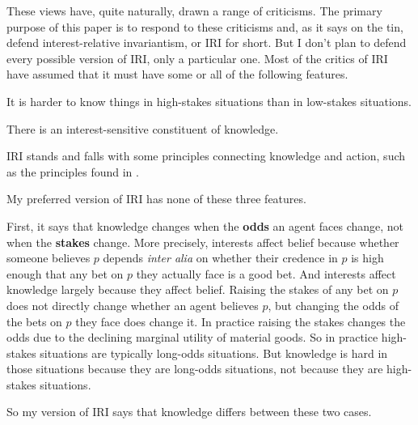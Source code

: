 \documentclass[oneside]{book}
\begin{document}
These views have, quite naturally, drawn a range of criticisms. The primary purpose of this paper is to respond to these criticisms and, as it says on the tin, defend interest-relative invariantism, or IRI for short. But I don't plan to defend every possible version of IRI, only a particular one. Most of the critics of IRI have assumed that it must have some or all of the following features.

\begin{enumerate*}
\item It is harder to know things in high-stakes situations than in low-stakes situations.
\item There is an interest-sensitive constituent of knowledge.
\item IRI stands and falls with some principles connecting knowledge and action, such as the principles found in \cite{Hawthorne2008-HAWKAA}.
\end{enumerate*}

\noindent My preferred version of IRI has none of these three features.

First, it says that knowledge changes when the \textbf{odds} an agent faces change, not when the \textbf{stakes} change. More precisely, interests affect belief because  whether someone believes $p$ depends \textit{inter alia} on whether their credence in $p$ is high enough that any bet on $p$ they actually face is a good bet. And interests affect knowledge largely because they affect belief. Raising the stakes of any bet on $p$ does not directly change whether an agent believes $p$, but changing the odds of the bets on $p$ they face does change it. In practice raising the stakes changes the odds due to the declining marginal utility of material goods. So in practice high-stakes situations are typically long-odds situations. But knowledge is hard in those situations because they are long-odds situations, not because they are high-stakes situations.

So my version of IRI says that knowledge differs between these two cases.
\end{document}
